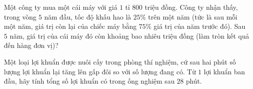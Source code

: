 \begin{bt}%
	Một công ty mua một cái máy với giá $1$ tỉ $800$ triệu đồng. Công ty nhận thấy, trong vòng $5$ năm đầu, tốc độ khấu hao là $25\%$ trên một năm (tức là sau mỗi một năm, giá trị còn lại của chiếc máy bằng $75\%$ giá trị của năm trước đó). Sau $5$ năm, giá trị của cái máy đó còn khoảng bao nhiêu triệu đồng (làm tròn kết quả đến hàng đơn vị)?
\end{bt}

\begin{bt}%
Một loại lợi khuẩn được nuôi cấy trong phòng thí nghiệm, cứ sau hai phút số lượng lợi khuẩn lại tăng lên gấp đôi so với số lượng đang có. Từ $ 1$ lợi khuẩn ban đầu, hãy tính tổng số lợi khuẩn có trong ống nghiệm sau $ 28$ phút.
\end{bt}

